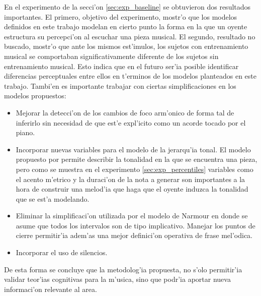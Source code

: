 En el experimento de la secci'on \ref{sec:exp_baseline} se obtuvieron dos resultados importantes. El primero, 
objetivo del experimento, mostr'o que los modelos definidos en este trabajo modelan en cierto punto la forma en la que 
un oyente estructura su percepci'on al escuchar una pieza musical. El segundo, resultado no buscado, mostr'o que ante los
mismos est'imulos, los sujetos con entrenamiento musical se comportaban significativamente diferente de los sujetos sin
entrenamiento musical. Esto indica que en el futuro ser'ia posible identificar diferencias perceptuales entre ellos en t'erminos 
de los modelos planteados en este trabajo. Tambi'en es importante trabajar con ciertas simplificaciones en los modelos propuestos:
\begin{itemize}
 \item Mejorar la detecci'on de los cambios de foco arm'onico de forma tal de inferirlo sin necesidad de que est'e expl'icito
 como un acorde tocado por el piano.

 \item Incorporar nuevas variables para el modelo de la jerarqu'ia tonal. El modelo propuesto por \cite{Krumhansl90} permite 
 describir la tonalidad en la que se encuentra una pieza, pero como se muestra en el experimento \ref{sec:exp_percentiles} 
 variables como el acento m'etrico y la duraci'on de la nota a generar son importantes a la hora de construir una melod'ia que 
 haga que el oyente induzca la tonalidad que se est'a modelando.

 \item Eliminar la simplificaci'on utilizada por el modelo de Narmour en donde se asume que todos los intervalos son de tipo
 implicativo. Manejar los puntos de cierre permitir'ia adem'as una mejor definici'on operativa de frase mel'odica.

 \item Incorporar el uso de silencios.

\end{itemize}


De esta forma se concluye que la metodolog'ia propuesta, no s'olo permitir'ia validar teor'ias cognitivas para la m'usica, sino
que podr'ia aportar nueva informaci'on relevante al area. 
